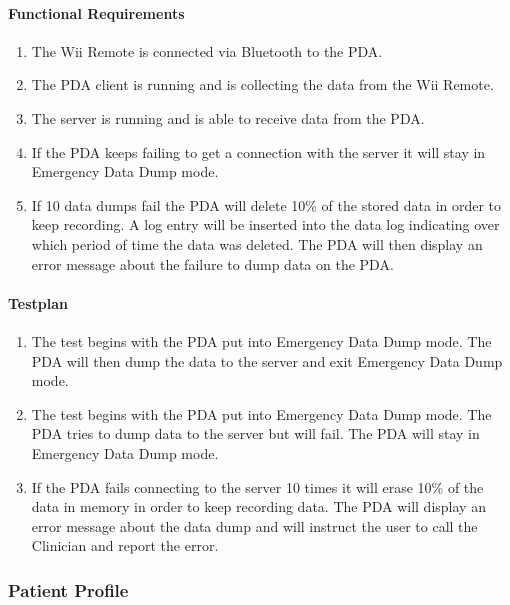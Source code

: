 \documentclass{article}
\begin{document}
\paragraph{Functional Requirements}
\begin{enumerate}
\item The Wii Remote is connected via Bluetooth to the PDA.
\item The PDA client is running and is collecting the data from the Wii Remote. 
\item The server is running and is able to receive data from the PDA.
\item If the PDA keeps failing to get a connection with the server it will stay in Emergency Data Dump mode.
\item If 10 data dumps fail the PDA will delete 10\% of the stored data in order to keep recording.  A log entry will be inserted into the data log indicating over which period of time the data was deleted. The PDA will then display an error message about the failure to dump data on the PDA.
\end{enumerate}

\paragraph{Testplan}
\begin{enumerate}
\item The test begins with the PDA put into Emergency Data Dump mode.  The PDA will then dump the data to the server and exit Emergency Data Dump mode.
\item The test begins with the PDA put into Emergency Data Dump mode.  The PDA tries to dump data to the server but will fail.  The PDA will stay in Emergency Data Dump mode.
\item If the PDA fails connecting to the server 10 times it will erase 10\% of the data in memory in order to keep recording data.  The PDA will display an error message about the data dump and will instruct the user to call the Clinician and report the error.
\end{enumerate}



\subsubsection {Patient Profile}\label{sec: Patient Profile}
\end{document}
